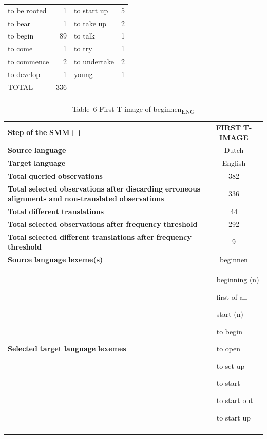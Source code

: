 \begin{table}
\begin{tabular}{lr@{\hspace{5em}}lr}
{to} {be} {rooted} &  1   &    {to} {start} {up} &  {5}\\
{to} {bear} &  1          &           {to} {take} {up} &  2\\
{to} {begin} &  {89}      &       {to} {talk} &  1\\
{to} {come} &  1          &           {to} {try} &  1\\
{to} {commence} &  2      &       {to} {undertake} &  2\\
{to} {develop} &  1       &        {young} &  1\\
{TOTAL} &  336\\
\lspbottomrule
\end{tabular}
\end{table}


\begin{table}
\caption{Table~6  First T-image of beginnen\textsubscript{ENG}}

\begin{tabularx}{\textwidth}{XXX}
\lsptoprule
\textbf{Step} \textbf{of} \textbf{the} \textbf{SMM++} & \multicolumn{2}{c}{ \textbf{FIRST} \textbf{T-IMAGE}}\\
\textbf{Source} \textbf{language} & \multicolumn{2}{c}{ Dutch}\\
\textbf{Target} \textbf{language} & \multicolumn{2}{c}{ English}\\
\textbf{Total} \textbf{queried} \textbf{observations} & \multicolumn{2}{c}{ 382}\\
\textbf{Total} \textbf{selected} \textbf{observations} \textbf{after} \textbf{discarding} \textbf{erroneous} \textbf{alignments} \textbf{and} \textbf{non-translated} \textbf{observations} & \multicolumn{2}{c}{ 336}\\
\textbf{Total} \textbf{different} \textbf{translations} & \multicolumn{2}{c}{ 44}\\
\textbf{Total} \textbf{selected} \textbf{observations} \textbf{after} \textbf{frequency} \textbf{threshold}  & \multicolumn{2}{c}{ 292}\\
\textbf{Total} \textbf{selected} \textbf{different} \textbf{translations} \textbf{after} \textbf{frequency} \textbf{threshold} & \multicolumn{2}{c}{ 9}\\
\textbf{Source} \textbf{language} \textbf{lexeme(s)} & \multicolumn{2}{c}{ beginnen}\\
\textbf{Selected} \textbf{target} \textbf{language} \textbf{lexemes} & 
 &  beginning (n)

 first of all

 start (n)

 to begin

 to open

 to set up

 to start

 to start out

 to start up\\
\lspbottomrule
\end{tabularx}
\end{table}

